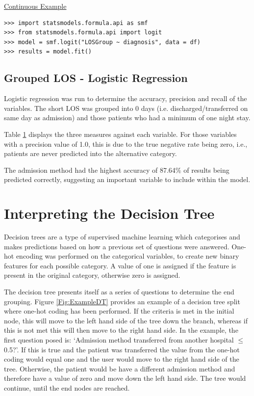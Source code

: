 \documentclass[../thesis.tex]{subfiles}
\begin{document}
\underline{Continuous Example}



\begin{lstlisting}[style = pystyle]
>>> import statsmodels.formula.api as smf
>>> from statsmodels.formula.api import logit
>>> model = smf.logit("LOSGroup ~ diagnosis", data = df)
>>> results = model.fit()
\end{lstlisting}
\subsection{Grouped LOS - Logistic Regression}
Logistic regression was run to determine the accuracy, precision and recall of the variables. The short LOS was grouped into 0 days (i.e. discharged/transferred on same day as admission) and those patients who had a minimum of one night stay. 

Table \ref{} displays the three measures against each variable. For those variables with a precision value of 1.0, this is due to the true negative rate being zero, i.e., patients are never predicted into the alternative category. 

The admission method had the highest accuracy of 87.64\% of results being predicted correctly, suggesting an important variable to include within the model.




\section{Interpreting the Decision Tree}
Decision trees are a type of supervised machine learning which categorises and makes predictions based on how a previous set of questions were answered. One-hot encoding was performed on the categorical variables, to create new binary features for each possible category. A value of one is assigned if the feature is present in the original category, otherwise zero is assigned. 

The decision tree presents itself as a series of questions to determine the end grouping. Figure \ref{Fig:ExampleDT} provides an example of a decision tree split where one-hot coding has been performed. If the criteria is met in the initial node, this will move to the left hand side of the tree down the branch, whereas if this is not met this will then move to the right hand side. In the example, the first question posed is: `Admission method transferred from another hospital $\leq$0.5?'. If this is true and the patient was transferred the value from the one-hot coding would equal one and the user would move to the right hand side of the tree. Otherwise, the patient would be have a different admission method and therefore have a value of zero and move down the left hand side. The tree would continue, until the end nodes are reached.
\end{document}
